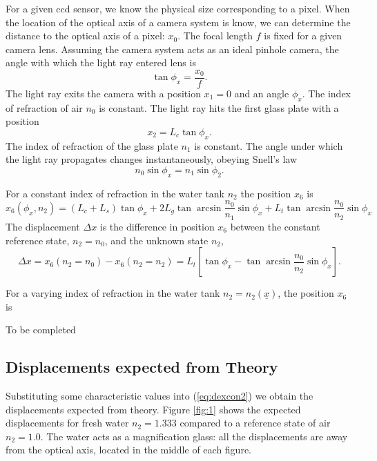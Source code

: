 \documentclass{article}
\begin{document}
For a given ccd sensor, we know the physical size corresponding to a pixel. When the location of the optical axis of a camera system is know, we can determine the distance to the optical axis of a pixel: $x_0$. The focal length $f$ is fixed for a given camera lens. Assuming the camera system acts as an ideal pinhole camera, the angle with which the light ray entered lens is
\begin{equation}
	\tan \phi_x = \frac{x_0}{f}.
\end{equation}
The light ray exits the camera with a position $x_1 = 0$ and an angle $\phi_x$. The index of refraction of air $n_0$ is constant. The light ray hits the first glass plate with a position
\begin{equation}
	x_2 = L_c \tan \phi_x.
\end{equation}
The index of refraction of the glass plate $n_1$ is constant. The angle under which the light ray propagates changes instantaneously, obeying Snell's law
\begin{equation}
	n_0 \sin \phi_x = n_1 \sin \phi_2.
\end{equation}

For a constant index of refraction in the water tank $n_2$ the position $x_6$ is
\begin{equation}
	x_6 (\phi_x, n_2) = (L_c+L_s) \tan \phi_x + 2 L_g \tan \arcsin \frac{n_0}{n_1} \sin \phi_x + L_t \tan \arcsin \frac{n_0}{n_2} \sin \phi_x
\end{equation}
The displacement $\Delta x$ is the difference in position $x_6$ between the constant reference state, $n_2 = n_0$, and the unknown state $n_2$, 
\begin{equation}
	\label{eq:dexcon2}
	\Delta x = x_6 (n_2 = n_0) - x_6 (n_2 = n_2) = L_t \left[ \tan \phi_x - \tan \arcsin \frac{n_0}{n_2} \sin \phi_x\right].
\end{equation}

For a varying index of refraction in the water tank $n_2 = n_2(\underline{x})$, the position $x_6$ is

\vspace{1cm}
To be completed 
\vspace{1cm}

\subsection{Displacements expected from Theory}
Substituting some characteristic values into (\ref{eq:dexcon2}) we obtain the displacements expected from theory. Figure \ref{fig:1} shows the expected displacements for fresh water $n_2 = 1.333$ compared to a reference state of air $n_2 = 1.0$. The water acts as a magnification glass: all the displacements are away from the optical axis, located in the middle of each figure. 
\end{document}
